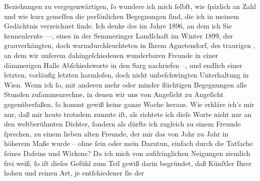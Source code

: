 \begin{ledgroupsized}[t]{13cm}
               Beziehungen zu vergegenwärtigen, ſo wundere ich mich ſelbſt, wie ſpärlich an Zahl und
               wie kurz gemeſſen die perſönlichen Begegnungen ſind, die ich in meinem Gedächtnis
               verzeichnet finde. Ich denke des \label{K_L02377_2v}\label{K_L02377_2h} im Jahre 1896, an dem ich Sie kennenlernte —, eines \label{K_L02377_3v}\label{K_L02377_3h} in der Semmeringer Landſchaft im
                  Winter 1899, der grauverhängten, doch warmdurchleuchteten \label{K_L02377_4v}\label{K_L02377_4h} in Ihrem Agnetendorf, des traurigen \label{K_L02377_5v}\label{K_L02377_5h}, an dem wir unſerem dahingeſchiedenen wunderbaren Freunde in einer dämmerigen Halle
               Abſchiedsworte in den Sarg nachriefen –, und endlich einer letzten, vorläufig letzten
               harmloſen, doch nicht unbeſchwingten Unterhaltung in Wien. Wenn ich ſo, mit anderen mehr oder minder flüchtigen Begegnungen alle
               Stunden zuſammenrechne, in denen wir uns von Angeſicht zu Angeſicht gegenüberſaßen,
               ſo kommt gewiß keine ganze Woche heraus. Wie erkläre ich’s mir nur, daß mir heute
               trotzdem zumute iſt, als richtete ich dieſe Worte nicht nur an den weltberühmten
               Dichter, ſondern als dürfte ich zugleich zu einem Freunde ſprechen, zu einem lieben
               alten Freunde, der mir das von Jahr zu Jahr in höherem Maße wurde – ohne ſein oder
               mein Dazutun, einfach durch die Tatſache ſeines Daſeins und Wirkens? Da ich mich von
               aufdringlichen Neigungen ziemlich frei weiß, ſo iſt dieſes Gefühl zum Teil gewiß
               darin begründet, daß Künſtler Ihrer hohen und reinen Art, je entſchiedener ſie der

\end{ledgroupsized}

